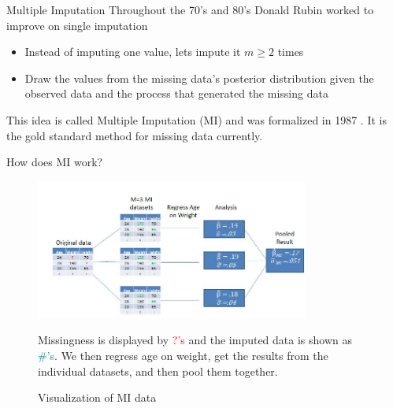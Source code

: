 \begin{frame}{Multiple Imputation}
Throughout the 70's and 80's Donald Rubin worked to improve on single imputation
\begin{itemize}
 \item Instead of imputing one value, lets impute it $m\geq 2$ times
 \item Draw the values from the missing data's posterior distribution given the observed
 data and the process that generated the missing data
\end{itemize}
This idea is called Multiple Imputation (MI) and was formalized in 1987 \cite{Rubin1987}. It is the gold standard method
for missing data currently.


\end{frame}


\begin{frame}{How does MI work?}
 \begin{figure}[h!]
  \centering
    \includegraphics[width=0.8\textwidth]{mi_example_full.jpg}
  \caption{Visualization of MI data}
\label{fig:miexample}
\medskip
\small
Missingness is displayed by \textcolor{red}{?'s} and the imputed data is shown  as \textcolor{teal}{\#'s}.
We then regress age on weight, get the results from the individual datasets, and then pool them together.
\end{figure}
\end{frame}

